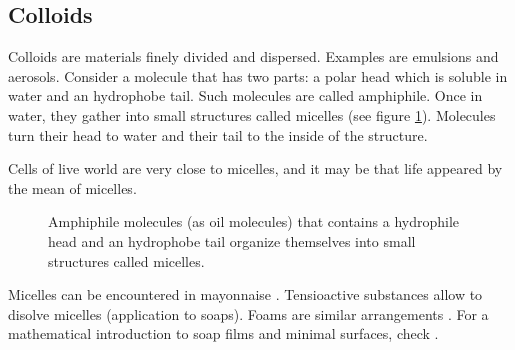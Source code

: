 \documentclass[12pt]{book}
\begin{document}
\subsection{Colloids}
Colloids  are materials finely divided and
dispersed. Examples are emulsions  and aerosols.
Consider a molecule that has two parts: a polar head which is soluble in
water and an hydrophobe tail. Such molecules are called
amphiphile. Once in
water, they gather into small structures called micelles
(see figure 
\ref{fighuileeau}). Molecules turn their head to water and their tail to the
inside of the structure.
\begin{rem}
Cells of live world are very close to micelles, and it may be that
life
appeared by the mean of micelles.
\end{rem}

\begin{figure}[htb]
 \centerline{}   
 \caption{Amphiphile molecules (as oil molecules) that contains a hydrophile
   head and an hydrophobe tail organize themselves into small structures
   called micelles.}
\label{fighuileeau}
\end{figure}
Micelles can be encountered in mayonnaise
\cite{ph:cooki:Grosser81,ph:cooki:McGee84,ph:cooki:McGee90}.
Tensioactive substances allow to disolve micelles (application to soaps).
Foams are similar arrangements
\cite{ph:foams:Adamson76,ph:foams:Aubert86,ph:foams:Bikerman73}.
For a mathematical introduction to soap films and minimal surfaces,
check \cite{ma:equad:Morgan95}. 
\end{document}
